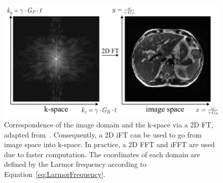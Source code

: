 \begin{figure}[h] %
	\centering
	\includegraphics[width=\linewidth]{./Images/2D_MRI_Measurement.png} 
	\caption{Correspondence of the image domain and the k-space via a 2D FT, adapted from~\cite{SamplingStrategies}. Consequently, a 2D iFT can be used to go from image space into k-space. In practice, a 2D FFT and iFFT are used due to faster computation. The coordinates of each domain are defined by the Larmor frequency according to Equation~\ref{eq:LarmorFrequency}.}
	\label{fig:2D_MRI_Measurement}
\end{figure}

